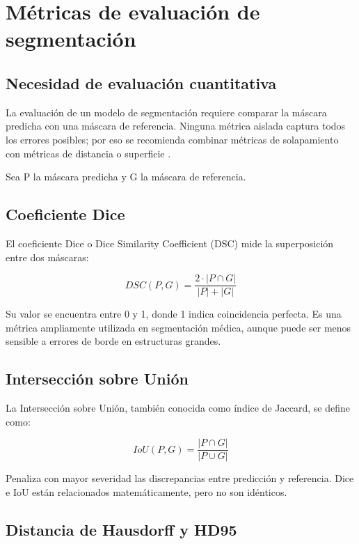 \section{Métricas de evaluación de segmentación}

\subsection{Necesidad de evaluación cuantitativa}

La evaluación de un modelo de segmentación requiere comparar la máscara predicha con una máscara de referencia. Ninguna métrica aislada captura todos los errores posibles; por eso se recomienda combinar métricas de solapamiento con métricas de distancia o superficie \parencite{taha_metrics_2015,maierhein_metrics_reloaded_2024}.

Sea P la máscara predicha y G la máscara de referencia.

\subsection{Coeficiente Dice}

El coeficiente Dice o Dice Similarity Coefficient (DSC) mide la superposición entre dos máscaras:

\begin{equation*}
DSC(P, G) = \frac{2 \cdot |P \cap G|}{|P| + |G|} \tag{8.1}
\end{equation*}

Su valor se encuentra entre 0 y 1, donde 1 indica coincidencia perfecta. Es una métrica ampliamente utilizada en segmentación médica, aunque puede ser menos sensible a errores de borde en estructuras grandes.

\subsection{Intersección sobre Unión}

La Intersección sobre Unión, también conocida como índice de Jaccard, se define como:

\begin{equation*}
IoU(P, G) = \frac{|P \cap G|}{|P \cup G|} \tag{8.2}
\end{equation*}

Penaliza con mayor severidad las discrepancias entre predicción y referencia. Dice e IoU están relacionados matemáticamente, pero no son idénticos.

\subsection{Distancia de Hausdorff y HD95}

